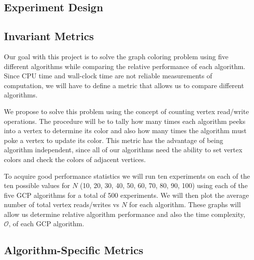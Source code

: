 \documentclass{article}
\begin{document}
\begin{multicols}{2}
\section{Experiment Design}
\subsection{Invariant Metrics}
Our goal with this project is to solve the graph coloring problem using five different algorithms while comparing the relative performance of each algorithm. Since CPU time and wall-clock time are not reliable measurements of computation, we will have to define a metric that allows us to compare different algorithms.\par  We propose to solve this problem using the concept of counting vertex read/write operations. The procedure will be to tally how many times each algorithm peeks into a vertex to determine its color and also how many times the algorithm must poke a vertex to update its color. This metric has the advantage of being algorithm independent, since all of our algorithms need the ability to set vertex colors and check the colors of adjacent vertices.\par
To acquire good performance statistics we will run ten experiments on each of the ten possible values for $N$ (10, 20, 30, 40, 50, 60, 70, 80, 90, 100) using each of the five GCP algorithms for a total of 500 experiments. We will then plot the average number of total vertex reads/writes vs $N$ for each algorithm. These graphs will allow us determine relative algorithm performance and also the time complexity, $\mathcal{O}$, of each GCP algorithm.
\subsection{Algorithm-Specific Metrics}

\end{multicols}
\end{document}
